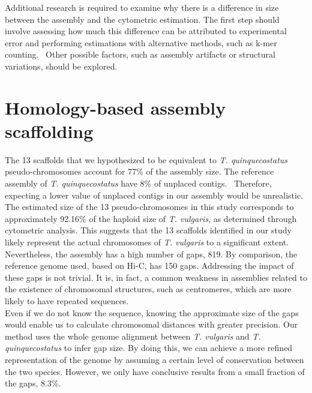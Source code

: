 Additional research is required to examine why there is a difference in size between the assembly and the cytometric estimation. The first step should involve assessing how much this difference can be attributed to experimental error and performing estimations with alternative methods, such as k-mer counting.~\cite{pflugMeasuringGenomeSizes2020} Other possible factors, such as assembly artifacts or structural variations, should be explored. \\

\section*{Homology-based assembly scaffolding}

The 13 scaffolds that we hypothesized to be equivalent to \textit{T. quinquecostatus} pseudo-chromosomes account for 77\% of the assembly size. The reference assembly of \textit{T. quinquecostatus} have 8\% of unplaced contigs.~\cite{sunChromosomelevelAssemblyAnalysis2022} Therefore, expecting a lower value of unplaced contigs in our assembly would be unrealistic.\\

The estimated size of the 13 pseudo-chromosomes in this study corresponds to approximately 92.16\% of the haploid size of \textit{T. vulgaris}, as determined through cytometric analysis. This suggests that the 13 scaffolds identified in our study likely represent the actual chromosomes of \textit{T. vulgaris} to a significant extent.\\

Nevertheless, the assembly has a high number of gaps, 819. By comparison, the reference genome used, based on Hi-C, has 150 gaps. Addressing the impact of these gaps is not trivial. It is, in fact, a common weakness in assemblies related to the existence of chromosomal structures, such as centromeres, which are more likely to have repeated sequences.~\cite{peonaHowCompleteAre2018} \\

Even if we do not know the sequence, knowing the approximate size of the gaps would enable us to calculate chromosomal distances with greater precision. Our method uses the whole genome alignment between \textit{T. vulgaris} and \textit{T. quinquecostatus} to infer gap size. By doing this, we can achieve a more refined representation of the genome by assuming a certain level of conservation between the two species. However, we only have conclusive results from a small fraction of the gaps, 8.3\%. \\



